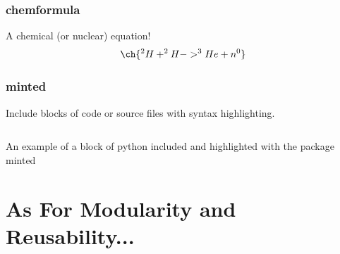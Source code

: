 \documentclass[hidelinks, 12pt]{article}%
\begin{document}
        \subsubsection{chemformula}
            A chemical (or nuclear) equation!
            \begin{equation}
                \ch{
                ^{2}H + ^{2}H -> ^{3}He + n^{0}
                }
                \label{eqt:nucEnerReleased}
            \end{equation}

        \subsubsection{minted}
            Include blocks of code or source files with syntax highlighting.
            \begin{listing}[H]
                \inputminted{python}{./demo.py}
                \caption{An example of a block of python included and highlighted with the package minted}
                \label{lst:pythonExample}
            \end{listing}


    \section{As For Modularity and Reusability...}
\end{document}
